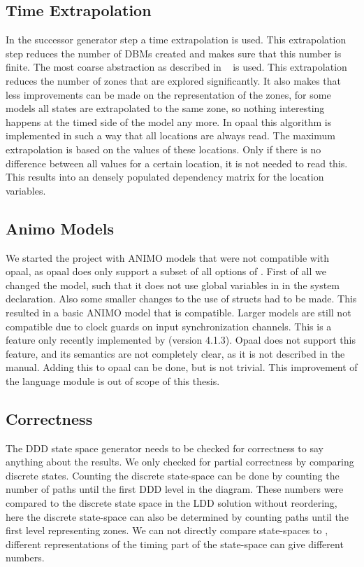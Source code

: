 \subsection{Time Extrapolation}
\label{subsec:extrapolation}
In the successor generator step a time extrapolation is used. This extrapolation step reduces the number of DBMs created and makes sure that this number is finite. The most coarse abstraction as described in ~\cite{Behrmann2004} is used. This extrapolation reduces the number of zones that are explored significantly. It also makes that less improvements can be made on the representation of the zones, for some models all states are extrapolated to the same zone, so nothing interesting happens at the timed side of the model any more. In opaal this algorithm is implemented in such a way that all \uppaal{} locations are always read. The maximum extrapolation is based on the values of these locations. Only if there is no difference between all values for a certain location, it is not needed to read this. This results into an densely populated dependency matrix for the location variables. 

\subsection{Animo Models}
We started the project with ANIMO models that were not compatible with opaal, as opaal does only support a subset of all options of \uppaal{}. First of all we changed the model, such that it does not use global variables in in the system declaration. Also some smaller changes to the use of structs had to be made. This resulted in a basic ANIMO model that is compatible. Larger models are still not compatible due to clock guards on input synchronization channels. This is a feature only recently implemented by \uppaal{} (version 4.1.3). Opaal does not support this feature, and its semantics are not completely clear, as it is not described in the manual. Adding this to opaal can be done, but is not trivial. This improvement of the language module is out of scope of this thesis.  

\subsection{Correctness}
The DDD state space generator needs to be checked for correctness to say anything about the results. We only checked for partial correctness by comparing discrete states. Counting the discrete state-space can be done by counting the number of paths until the first DDD level in the diagram. These numbers were compared to the discrete state space in the LDD solution without reordering, here the discrete state-space can also be determined by counting paths until the first level representing zones. We can not directly compare state-spaces to \uppaal{}, different representations of the timing part of the state-space can give different numbers.
